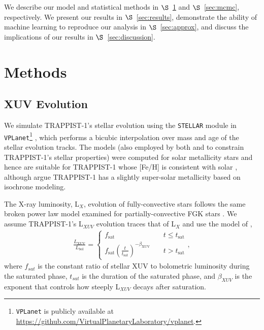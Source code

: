 \documentclass[twocolumn]{aastex62}
\newcommand{\vplanet}[0]{\texttt{VPLanet}\xspace}
\newcommand{\stellar}[0]{\texttt{STELLAR}\xspace}
\begin{document}
We describe our model and statistical methods in $\S$~\ref{sec:methods} and $\S$~\ref{sec:mcmc}, respectively. We present our results in $\S$~\ref{sec:results}, demonstrate the ability of machine learning to reproduce our analysis in $\S$~\ref{sec:approx}, and discuss the implications of our results in $\S$~\ref{sec:discussion}.

\section{Methods} \label{sec:methods}

\subsection{XUV Evolution} \label{sec:model}

We simulate TRAPPIST-1's stellar evolution using the \stellar module in \vplanet\footnote{\vplanet is publicly available at \href{https://github.com/VirtualPlanetaryLaboratory/vplanet}{https://github.com/VirtualPlanetaryLaboratory/vplanet}.} \citep{Barnes2019}, which performs a bicubic interpolation over mass and age of the \citet{Baraffe2015} stellar evolution tracks. The \citet{Baraffe2015} models (also employed by both \citet{Burgasser2017} and \citet{vanGrootel2018} to constrain TRAPPIST-1's stellar properties) were computed for solar metallicity stars and hence are suitable for TRAPPIST-1 whose [Fe/H] is consistent with solar \citep{Gillon2016}, although \citet{Burgasser2017} argue TRAPPIST-1 has a slightly super-solar metallicity based on isochrone modeling.

The X-ray luminosity, L$_{X}$, evolution of fully-convective stars follows the same broken power law model examined for partially-convective FGK stars \citep{Wright2016,Wright2018}. We assume TRAPPIST-1's L$_{XUV}$ evolution traces that of L$_{X}$ and use the model of \citet{Ribas2005},
\begin{align}
\label{eqn:lxuv}
\frac{L_\mathrm{XUV}}{L_\mathrm{bol}} = \left\{
				\begin{array}{lcr}
					f_\mathrm{sat} &\ & t \leq t_\mathrm{sat} \\
					f_\mathrm{sat}\left(\frac{t}{t_\mathrm{sat}}\right)^{-\beta_\mathrm{XUV}} &\ & t > t_\mathrm{sat}
				\end{array}
				\right.,
\end{align}
where $f_{sat}$ is the constant ratio of stellar XUV to bolometric luminosity during the saturated phase, $t_{sat}$ is the duration of the saturated phase, and $\beta_{XUV}$ is the exponent that controls how steeply L$_{XUV}$ decays after saturation. 
\end{document}
